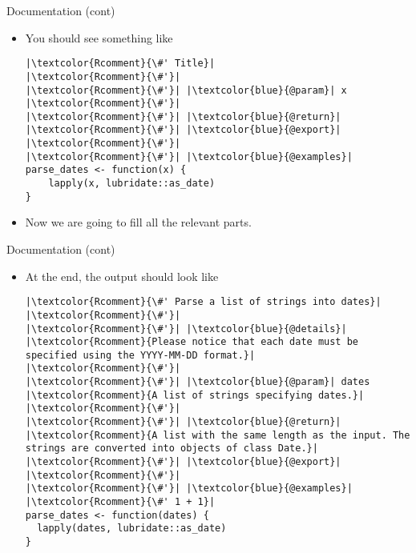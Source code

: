 \documentclass[
hyperref={bookmarks=false},
xcolor={dvipsnames,svgnames*,x11names*}, 
12pt
]{beamer}
\begin{document}
\begin{frame}[fragile]{Documentation (cont)}
\vspace{-0.5cm}
\begin{itemize}
\itemsep 2ex
\item You should see something like
\begin{lstlisting}
|\textcolor{Rcomment}{\#' Title}|
|\textcolor{Rcomment}{\#'}|
|\textcolor{Rcomment}{\#'}| |\textcolor{blue}{@param}| x 
|\textcolor{Rcomment}{\#'}|
|\textcolor{Rcomment}{\#'}| |\textcolor{blue}{@return}|
|\textcolor{Rcomment}{\#'}| |\textcolor{blue}{@export}|
|\textcolor{Rcomment}{\#'}|
|\textcolor{Rcomment}{\#'}| |\textcolor{blue}{@examples}|
parse_dates <- function(x) {
	lapply(x, lubridate::as_date)
}
\end{lstlisting}
\item Now we are going to fill all the relevant parts. 
\end{itemize}
\end{frame}

\begin{frame}[fragile]{Documentation (cont)}
\vspace{-0.5cm}
\begin{itemize}
\itemsep 2ex
\item At the end, the output should look like
\begin{lstlisting}
|\textcolor{Rcomment}{\#' Parse a list of strings into dates}|
|\textcolor{Rcomment}{\#'}|
|\textcolor{Rcomment}{\#'}| |\textcolor{blue}{@details}| |\textcolor{Rcomment}{Please notice that each date must be specified using the YYYY-MM-DD format.}|
|\textcolor{Rcomment}{\#'}|
|\textcolor{Rcomment}{\#'}| |\textcolor{blue}{@param}| dates |\textcolor{Rcomment}{A list of strings specifying dates.}|
|\textcolor{Rcomment}{\#'}|
|\textcolor{Rcomment}{\#'}| |\textcolor{blue}{@return}| |\textcolor{Rcomment}{A list with the same length as the input. The strings are converted into objects of class Date.}|
|\textcolor{Rcomment}{\#'}| |\textcolor{blue}{@export}|
|\textcolor{Rcomment}{\#'}|
|\textcolor{Rcomment}{\#'}| |\textcolor{blue}{@examples}|
|\textcolor{Rcomment}{\#' 1 + 1}|
parse_dates <- function(dates) {
  lapply(dates, lubridate::as_date)
}
\end{lstlisting}
\end{itemize}
\end{frame}
\end{document}
